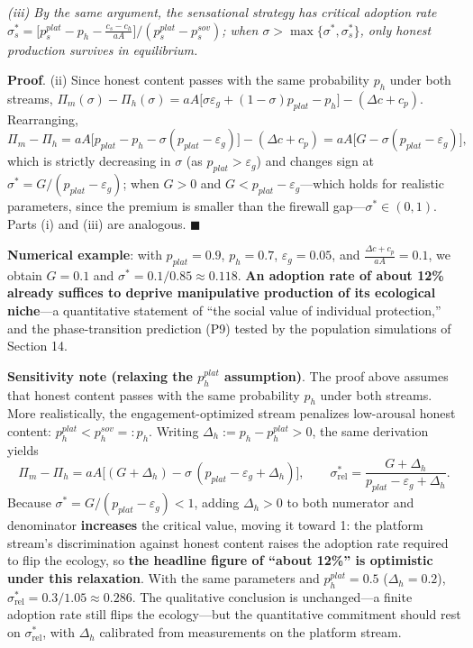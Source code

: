\documentclass[
  11pt]{article}
\begin{document}
\emph{(iii) By the same argument, the sensational strategy has critical
adoption rate
\(\sigma_s^* = \big[p_s^{plat} - p_h - \frac{c_s - c_h}{aA}\big] / (p_s^{plat} - p_s^{sov})\);
when \(\sigma > \max\{\sigma^*, \sigma_s^*\}\), only honest production
survives in equilibrium.}

\textbf{Proof}. (ii) Since honest content passes with the same
probability \(p_h\) under both streams,
\(\Pi_m(\sigma) - \Pi_h(\sigma) = aA\big[\sigma\varepsilon_g + (1-\sigma)p_{plat} - p_h\big] - (\Delta c + c_p)\).
Rearranging,
\[\Pi_m - \Pi_h = aA\big[p_{plat} - p_h - \sigma(p_{plat} - \varepsilon_g)\big] - (\Delta c + c_p) = aA\big[G - \sigma(p_{plat}-\varepsilon_g)\big],\]
which is strictly decreasing in \(\sigma\) (as
\(p_{plat} > \varepsilon_g\)) and changes sign at
\(\sigma^* = G/(p_{plat}-\varepsilon_g)\); when \(G > 0\) and
\(G < p_{plat} - \varepsilon_g\)---which holds for realistic parameters,
since the premium is smaller than the firewall
gap---\(\sigma^* \in (0,1)\). Parts (i) and (iii) are analogous.
\(\blacksquare\)

\textbf{Numerical example}: with \(p_{plat} = 0.9\), \(p_h = 0.7\),
\(\varepsilon_g = 0.05\), and \(\frac{\Delta c + c_p}{aA} = 0.1\), we
obtain \(G = 0.1\) and \(\sigma^* = 0.1/0.85 \approx 0.118\). \textbf{An
adoption rate of about 12\% already suffices to deprive manipulative
production of its ecological niche}---a quantitative statement of ``the
social value of individual protection,'' and the phase-transition
prediction (P9) tested by the population simulations of Section 14.

\textbf{Sensitivity note (relaxing the \(p_h^{plat}\) assumption)}. The
proof above assumes that honest content passes with the same probability
\(p_h\) under both streams. More realistically, the engagement-optimized
stream penalizes low-arousal honest content:
\(p_h^{plat} < p_h^{sov} =: p_h\). Writing
\(\Delta_h := p_h - p_h^{plat} > 0\), the same derivation yields
\[\Pi_m - \Pi_h = aA\big[(G + \Delta_h) - \sigma\,(p_{plat} - \varepsilon_g + \Delta_h)\big], \qquad \sigma^*_{\mathrm{rel}} = \frac{G + \Delta_h}{p_{plat} - \varepsilon_g + \Delta_h}.\]
Because \(\sigma^* = G/(p_{plat}-\varepsilon_g) < 1\), adding
\(\Delta_h > 0\) to both numerator and denominator \textbf{increases}
the critical value, moving it toward 1: the platform stream's
discrimination against honest content raises the adoption rate required
to flip the ecology, so \textbf{the headline figure of ``about 12\%'' is
optimistic under this relaxation}. With the same parameters and
\(p_h^{plat} = 0.5\) (\(\Delta_h = 0.2\)),
\(\sigma^*_{\mathrm{rel}} = 0.3/1.05 \approx 0.286\). The qualitative
conclusion is unchanged---a finite adoption rate still flips the
ecology---but the quantitative commitment should rest on
\(\sigma^*_{\mathrm{rel}}\), with \(\Delta_h\) calibrated from
measurements on the platform stream.
\end{document}

